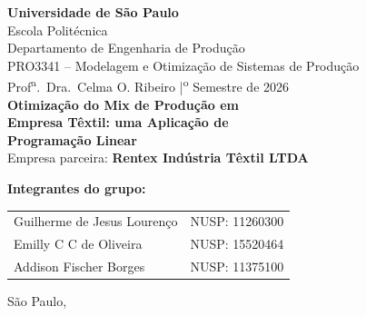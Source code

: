 \begin{titlepage}
\centering

\vspace*{0.5cm}
{\large\bfseries Universidade de São Paulo}\\[0.3cm]
{\large Escola Politécnica}\\[0.1cm]
{\normalsize Departamento de Engenharia de Produção}\\[2.0cm]

{\large PRO3341 -- Modelagem e Otimização de Sistemas de Produção}\\[0.3cm]
{\normalsize Prof\textsuperscript{a}.\ Dra.\ Celma O. Ribeiro \quad|\textsuperscript{o} Semestre de 2026}\\[3.0cm]

{\LARGE\bfseries Otimização do Mix de Produção em\\[0.3cm]
Empresa Têxtil: uma Aplicação de\\[0.3cm]
Programação Linear}\\[1.0cm]

{\large Empresa parceira: \textbf{Rentex Indústria Têxtil LTDA}}\\[3.5cm]

\begin{flushleft}
\textbf{Integrantes do grupo:}\\[0.5cm]
\begin{tabular}{ll}
  Guilherme de Jesus Lourenço  & NUSP: 11260300 \\[0.3cm]
  Emilly C C de Oliveira       & NUSP: 15520464 \\[0.3cm]
  Addison Fischer Borges       & NUSP: 11375100 \\
\end{tabular}
\end{flushleft}

\vfill
{\normalsize São Paulo, \the\year}

\end{titlepage}
\newpage
